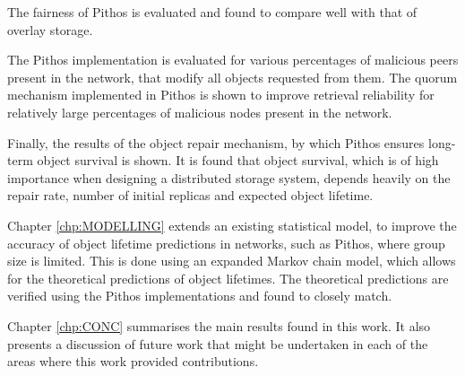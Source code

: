 The fairness of Pithos is evaluated and found to compare well with that of overlay storage.

The Pithos implementation is evaluated for various percentages of malicious peers present in the network, that modify all objects requested from them. The quorum mechanism implemented in Pithos is shown to improve retrieval reliability for relatively large percentages of malicious nodes present in the network.

Finally, the results of the object repair mechanism, by which Pithos ensures long-term object survival is shown. It is found that object survival, which is of high importance when designing a distributed storage system, depends heavily on the repair rate, number of initial replicas and expected object lifetime.

Chapter \ref{chp:MODELLING} extends an existing statistical model, to improve the accuracy of object lifetime predictions in networks, such as Pithos, where group size is limited. This is done using an expanded Markov chain model, which allows for the theoretical predictions of object lifetimes. The theoretical predictions are verified using the Pithos implementations and found to closely match.

Chapter \ref{chp:CONC} summarises the main results found in this work. It also presents a discussion of future work that might be undertaken in each of the areas where this work provided contributions.
